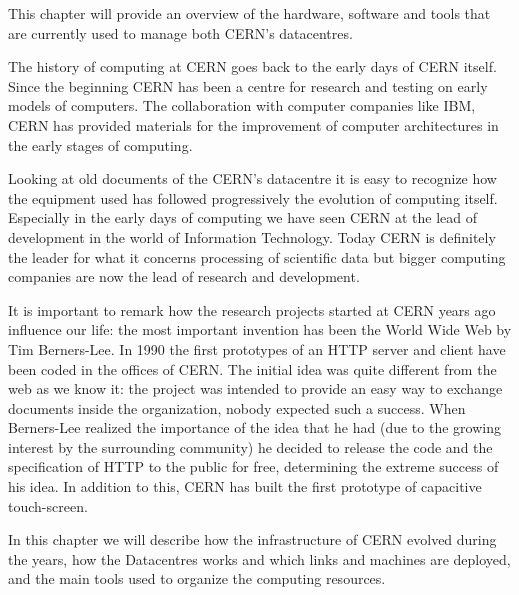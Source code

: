 This chapter will provide an overview of the hardware, software and tools
that are currently used to manage both CERN's datacentres.

The history of computing at CERN goes back to the early days of CERN
itself. Since the beginning CERN has been a centre for research and
testing on early models of computers. The collaboration with computer
companies like IBM, CERN has provided materials for the improvement of
computer architectures in the early stages of computing.

Looking at old documents of the CERN's datacentre it is easy to recognize
how the equipment used has followed progressively the evolution of
computing itself. Especially in the early days of computing we have seen
CERN at the lead of development in the world of Information Technology.
Today CERN is definitely the leader for what it concerns processing of
scientific data but bigger computing companies are now the lead of
research and development.

It is important to remark how the research projects started at CERN years
ago influence our life: the most important invention has been the World
Wide Web by Tim Berners-Lee. In 1990 the first prototypes of an HTTP
server and client have been coded in the offices of CERN. The initial idea
was quite different from the web as we know it: the project was intended
to provide an easy way to exchange documents inside the organization,
nobody expected such a success. When Berners-Lee realized the importance
of the idea that he had (due to the growing interest by the surrounding
community) he decided to release the code and the specification of HTTP to
the public for free, determining the extreme success of his idea. In
addition to this, CERN has built the first prototype of capacitive
touch-screen.

In this chapter we will describe how the infrastructure of CERN evolved
during the years, how the Datacentres works and which links and machines
are deployed, and the main tools used to organize the computing resources.
